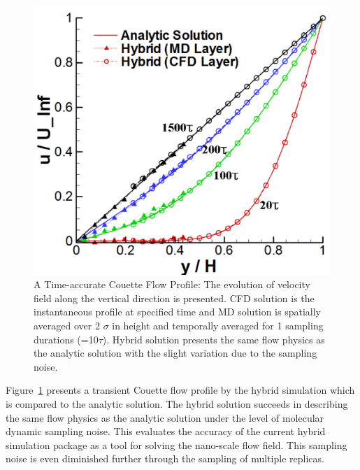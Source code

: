 \documentclass[]{aiaa-tc}%
\begin{document}
\begin{figure}
\includegraphics{Flat_Plate_Sol2.pdf}
\caption{A Time-accurate Couette Flow Profile: The evolution of velocity field 
along the vertical direction is presented. CFD solution is the instantaneous 
profile at specified time and MD solution is spatially averaged over 
2 $\sigma$ in height and temporally averaged for 1 sampling durations (=10$\tau$).
Hybrid solution presents the same flow physics as the analytic solution
with the slight variation due to the sampling noise.}
\label{Fig:Flat_Plate_Sol}
\end{figure}


Figure~\ref{Fig:Flat_Plate_Sol} presents a transient Couette flow profile 
by the hybrid simulation which is compared to the analytic solution. 
The hybrid solution succeeds in describing the same flow physics as the 
analytic solution under the level of molecular dynamic sampling noise.
This evaluates the accuracy of the current hybrid simulation package
as a tool for solving the nano-scale flow field. This sampling noise is 
even diminished further through the sampling of multiple replicas.\cite{JoCS2012}
\end{document}
